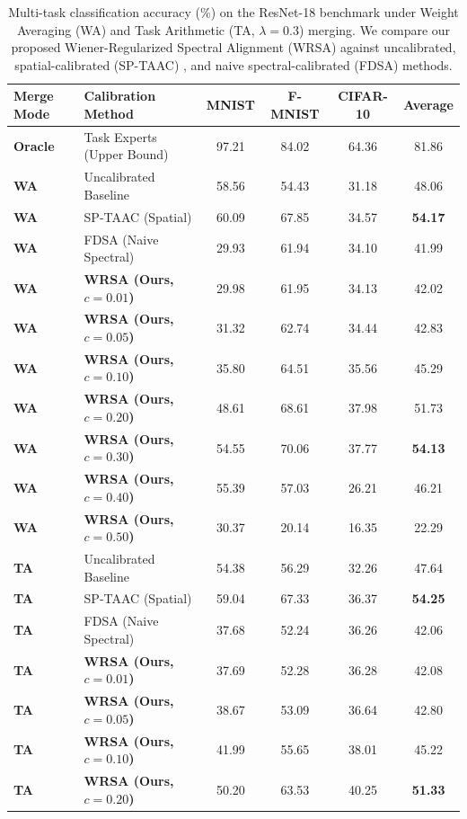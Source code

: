 \documentclass{article}
\theoremstyle{plain}
\theoremstyle{definition}
\theoremstyle{remark}
\begin{document}
\begin{table}[t]
\caption{Multi-task classification accuracy (\%) on the ResNet-18 benchmark under Weight Averaging (WA) and Task Arithmetic (TA, $\lambda = 0.3$) merging. We compare our proposed Wiener-Regularized Spectral Alignment (WRSA) against uncalibrated, spatial-calibrated (SP-TAAC) \cite{submission9}, and naive spectral-calibrated (FDSA) \cite{submission10} methods.}
\label{tab:results}
\vskip 0.15in
\begin{center}
\begin{small}
\begin{tabular}{llcccc}
\toprule
\textbf{Merge Mode} & \textbf{Calibration Method} & \textbf{MNIST} & \textbf{F-MNIST} & \textbf{CIFAR-10} & \textbf{Average} \\
\midrule
\textbf{Oracle} & Task Experts (Upper Bound) & 97.21 & 84.02 & 64.36 & 81.86 \\
\midrule
\textbf{WA} & Uncalibrated Baseline & 58.56 & 54.43 & 31.18 & 48.06 \\
\textbf{WA} & SP-TAAC \cite{submission9} (Spatial) & 60.09 & 67.85 & 34.57 & \textbf{54.17} \\
\textbf{WA} & FDSA \cite{submission10} (Naive Spectral) & 29.93 & 61.94 & 34.10 & 41.99 \\
\textbf{WA} & \textbf{WRSA (Ours, $c=0.01$)} & 29.98 & 61.95 & 34.13 & 42.02 \\
\textbf{WA} & \textbf{WRSA (Ours, $c=0.05$)} & 31.32 & 62.74 & 34.44 & 42.83 \\
\textbf{WA} & \textbf{WRSA (Ours, $c=0.10$)} & 35.80 & 64.51 & 35.56 & 45.29 \\
\textbf{WA} & \textbf{WRSA (Ours, $c=0.20$)} & 48.61 & 68.61 & 37.98 & 51.73 \\
\textbf{WA} & \textbf{WRSA (Ours, $c=0.30$)} & 54.55 & 70.06 & 37.77 & \textbf{54.13} \\
\textbf{WA} & \textbf{WRSA (Ours, $c=0.40$)} & 55.39 & 57.03 & 26.21 & 46.21 \\
\textbf{WA} & \textbf{WRSA (Ours, $c=0.50$)} & 30.37 & 20.14 & 16.35 & 22.29 \\
\midrule
\textbf{TA} & Uncalibrated Baseline & 54.38 & 56.29 & 32.26 & 47.64 \\
\textbf{TA} & SP-TAAC \cite{submission9} (Spatial) & 59.04 & 67.33 & 36.37 & \textbf{54.25} \\
\textbf{TA} & FDSA \cite{submission10} (Naive Spectral) & 37.68 & 52.24 & 36.26 & 42.06 \\
\textbf{TA} & \textbf{WRSA (Ours, $c=0.01$)} & 37.69 & 52.28 & 36.28 & 42.08 \\
\textbf{TA} & \textbf{WRSA (Ours, $c=0.05$)} & 38.67 & 53.09 & 36.64 & 42.80 \\
\textbf{TA} & \textbf{WRSA (Ours, $c=0.10$)} & 41.99 & 55.65 & 38.01 & 45.22 \\
\textbf{TA} & \textbf{WRSA (Ours, $c=0.20$)} & 50.20 & 63.53 & 40.25 & \textbf{51.33} \\
\bottomrule
\end{tabular}
\end{small}
\end{center}
\vskip -0.1in
\end{table}
\end{document}
